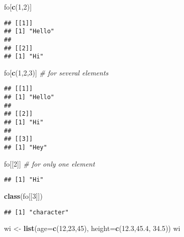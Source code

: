 \documentclass[
]{article}
\newenvironment{Shaded}{\begin{snugshade}}{\end{snugshade}}
\newcommand{\AttributeTok}[1]{\textcolor[rgb]{0.13,0.29,0.53}{#1}}
\newcommand{\CommentTok}[1]{\textcolor[rgb]{0.56,0.35,0.01}{\textit{#1}}}
\newcommand{\DecValTok}[1]{\textcolor[rgb]{0.00,0.00,0.81}{#1}}
\newcommand{\FloatTok}[1]{\textcolor[rgb]{0.00,0.00,0.81}{#1}}
\newcommand{\FunctionTok}[1]{\textcolor[rgb]{0.13,0.29,0.53}{\textbf{#1}}}
\newcommand{\NormalTok}[1]{#1}
\newcommand{\OtherTok}[1]{\textcolor[rgb]{0.56,0.35,0.01}{#1}}
\begin{document}
\begin{Shaded}
\begin{Highlighting}[]
\NormalTok{fo[}\FunctionTok{c}\NormalTok{(}\DecValTok{1}\NormalTok{,}\DecValTok{2}\NormalTok{)]}
\end{Highlighting}
\end{Shaded}

\begin{verbatim}
## [[1]]
## [1] "Hello"
## 
## [[2]]
## [1] "Hi"
\end{verbatim}

\begin{Shaded}
\begin{Highlighting}[]
\NormalTok{fo[}\FunctionTok{c}\NormalTok{(}\DecValTok{1}\NormalTok{,}\DecValTok{2}\NormalTok{,}\DecValTok{3}\NormalTok{)] }\CommentTok{\# for several elements}
\end{Highlighting}
\end{Shaded}

\begin{verbatim}
## [[1]]
## [1] "Hello"
## 
## [[2]]
## [1] "Hi"
## 
## [[3]]
## [1] "Hey"
\end{verbatim}

\begin{Shaded}
\begin{Highlighting}[]
\NormalTok{fo[[}\DecValTok{2}\NormalTok{]] }\CommentTok{\# for only one element}
\end{Highlighting}
\end{Shaded}

\begin{verbatim}
## [1] "Hi"
\end{verbatim}

\begin{Shaded}
\begin{Highlighting}[]
\FunctionTok{class}\NormalTok{(fo[[}\DecValTok{3}\NormalTok{]])}
\end{Highlighting}
\end{Shaded}

\begin{verbatim}
## [1] "character"
\end{verbatim}

\begin{Shaded}
\begin{Highlighting}[]
\NormalTok{wi }\OtherTok{\textless{}{-}} \FunctionTok{list}\NormalTok{(}\AttributeTok{age=}\FunctionTok{c}\NormalTok{(}\DecValTok{12}\NormalTok{,}\DecValTok{23}\NormalTok{,}\DecValTok{45}\NormalTok{), }\AttributeTok{height=}\FunctionTok{c}\NormalTok{(}\FloatTok{12.3}\NormalTok{,}\FloatTok{45.4}\NormalTok{, }\FloatTok{34.5}\NormalTok{))}
\NormalTok{wi}
\end{Highlighting}
\end{Shaded}
\end{document}
